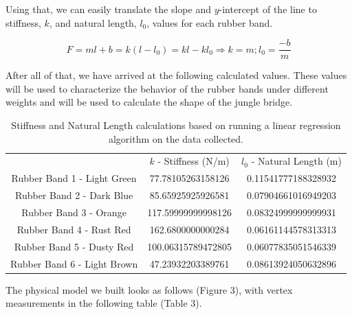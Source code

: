 \documentclass[10pt,letterpaper,onecolumn,report]{tau-class/tau}
\begin{document}
        Using that, we can easily translate the slope and \(y\)-intercept of the line to stiffness, \(k\), and natural length, \(l_0\), values for each rubber band.

        \begin{equation}
            F=ml + b = k(l-l_0) = kl - kl_0 \Rightarrow k = m; l_0 = \frac {-b} {m}
        \end{equation}

        After all of that, we have arrived at the following calculated values. These values will be used to characterize the behavior of the rubber bands under different weights and will be used to calculate the shape of the jungle bridge.
        
        \begin{table}[H]
            \centering
            \setcounter{table}{1} %
            \begin{tabular}{ccc}
                 &  \(k\) - Stiffness (N/m)& \(l_0\) - Natural Length (m)\\
                 Rubber Band 1 - Light Green
                &  77.78105263158126
                & 0.11541777188328932
                \\
                 Rubber Band 2 - Dark Blue
                &  85.65925925926581
                & 0.07904661016949203
                \\
                 Rubber Band 3 - Orange
                &  117.59999999998126
                & 0.08324999999999931
                \\
                 Rubber Band 4 - Rust Red
                &  162.6800000000284
                & 0.06161144578313313
                \\
                 Rubber Band 5 - Dusty Red
                &  100.06315789472805
                & 0.06077835051546339
                \\
                 Rubber Band 6 - Light Brown
                &  47.23932203389761
                & 0.08613924050632896
                \\
            \end{tabular}
            \caption{Stiffness and Natural Length calculations based on running a linear regression algorithm on the data collected.}
            \label{tab:my_label}
        \end{table}

        The physical model we built looks as follows (Figure 3), with vertex measurements in the following table (Table 3).
\end{document}
